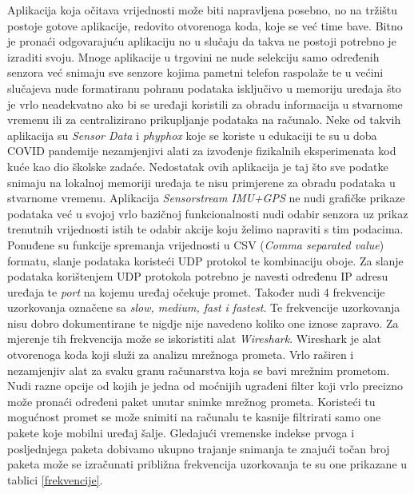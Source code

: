 \documentclass[times, utf8, diplomski]{fer}
\begin{document}
Aplikacija koja očitava vrijednosti može biti napravljena posebno, no na tržištu postoje gotove aplikacije, redovito otvorenoga koda, koje se već time bave.
Bitno je pronaći odgovarajuću aplikaciju no u slučaju da takva ne postoji potrebno je izraditi svoju. Mnoge aplikacije u trgovini ne nude selekciju samo određenih senzora
već snimaju sve senzore kojima pametni telefon raspolaže te u većini slučajeva nude formatiranu
pohranu podataka isključivo u memoriju uređaja što je vrlo neadekvatno ako bi se uređaji
koristili za obradu informacija u stvarnome vremenu ili za centralizirano prikupljanje podataka na računalo. Neke od takvih aplikacija su
\textit{Sensor Data} i \textit{phyphox} koje se koriste u edukaciji te su u doba COVID pandemije
nezamjenjivi alati za izvođenje fizikalnih eksperimenata kod kuće kao dio
školske zadaće. Nedostatak ovih aplikacija je taj što sve podatke snimaju na lokalnoj memoriji uređaja te nisu primjerene za obradu podataka u stvarnome vremenu.
Aplikacija \textit{Sensorstream IMU+GPS} ne nudi grafičke prikaze podataka već u svojoj vrlo bazičnoj funkcionalnosti nudi odabir senzora uz prikaz trenutnih
vrijednosti istih te odabir akcije koju želimo napraviti s tim podacima. Ponuđene su funkcije spremanja vrijednosti u CSV (\textit{Comma separated value}) formatu,
slanje podataka koristeći UDP protokol te kombinaciju oboje. Za slanje podataka korištenjem UDP protokola potrebno je navesti određenu IP adresu uređaja te \textit{port} na
kojemu uređaj očekuje promet. Također nudi 4 frekvencije uzorkovanja označene sa \textit{slow, medium, fast i fastest}. Te frekvencije uzorkovanja nisu dobro dokumentirane
te nigdje nije navedeno koliko one iznose zapravo. Za mjerenje tih frekvencija može se iskoristiti alat \textit{Wireshark}. Wireshark je alat otvorenoga koda koji
služi za analizu mrežnoga prometa. Vrlo raširen i nezamjenjiv alat za svaku granu računarstva koja se bavi mrežnim prometom. Nudi razne opcije od kojih je jedna 
od moćnijih ugrađeni filter koji vrlo precizno može pronaći određeni paket unutar snimke mrežnog prometa. Koristeći tu mogućnost promet se može snimiti na računalu
te kasnije filtrirati samo one pakete koje mobilni uređaj šalje. Gledajući vremenske indekse prvoga i posljednjega paketa dobivamo ukupno trajanje
snimanja te znajući točan broj paketa može se izračunati približna frekvencija uzorkovanja te su one prikazane u tablici \ref{frekvencije}.
\end{document}
